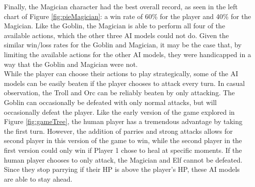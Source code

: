 Finally, the Magician character had the best overall record, as seen in the left chart of Figure \ref{fig:pieMagician}: a win rate of 60\% for the player and 40\% for the Magician. Like the Goblin, the Magician is able to perform all four of the available actions, which the other three AI models could not do. Given the similar win/loss rates for the Goblin and Magician, it may be the case that, by limiting the available actions for the other AI models, they were handicapped in a way that the Goblin and Magician were not.\\

While the player can choose their actions to play strategically, some of the AI models can be easily beaten if the player chooses to attack every turn. In casual observation, the Troll and Orc can be reliably beaten by only attacking. The Goblin can occasionally be defeated with only normal attacks, but will occasionally defeat the player. Like the early version of the game explored in Figure \ref{fig:gameTree}, the human player has a tremendous advantage by taking the first turn. However, the addition of parries and strong attacks allows for second player in this version of the game to win, while the second player in the first version could only win if Player 1 chose to heal at specific moments. If the human player chooses to only attack, the Magician and Elf cannot be defeated. Since they stop parrying if their HP is above the player's HP, these AI models are able to stay ahead.